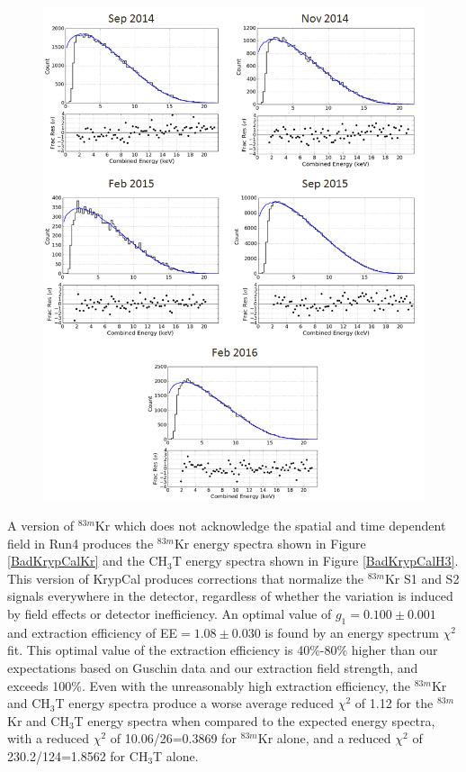 \begin{figure} [!h]
\includegraphics[scale=0.7]{Run04Corrections/KrypCal_2p22_AllCH3TEnergy.png}
 \label{Kr2p22_H3E}
\end{figure}


A version of $^{83m}$Kr which does not acknowledge the spatial and time dependent field in Run4 produces the $^{83m}$Kr energy spectra shown in Figure \ref{BadKrypCalKr} and the CH$_3$T energy spectra shown in Figure \ref{BadKrypCalH3}.  This version of KrypCal produces corrections that normalize the $^{83m}$Kr S1 and S2 signals everywhere in the detector, regardless of whether the variation is induced by field effects or detector inefficiency. An optimal value of $g_1=0.100 \pm 0.001$ and extraction efficiency of EE$=1.08 \pm 0.030$ is found by an energy spectrum $\chi^2$ fit.  This optimal value of the extraction efficiency is 40\%-80\% higher than our expectations based on Guschin data and our extraction field strength, and exceeds 100\%.  Even with the unreasonably high extraction efficiency, the $^{83m}$Kr and CH$_3$T energy spectra produce a worse average reduced $\chi^2$ of 1.12 for the $^{83m}$Kr and CH$_3$T energy spectra when compared to the expected energy spectra, with a reduced $\chi^2$ of 10.06/26=0.3869 for $^{83m}$Kr alone, and a reduced $\chi^2$ of 230.2/124=1.8562 for CH$_3$T alone.

